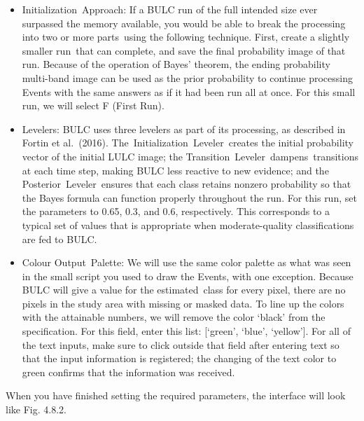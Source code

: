 \documentclass[
  letterpaper,
  DIV=11,
  numbers=noendperiod]{scrreprt}
\providecommand{\tightlist}{%
  \setlength{\itemsep}{0pt}\setlength{\parskip}{0pt}}\usepackage{longtable,booktabs,array}
\begin{document}
\begin{itemize}
\tightlist
\item
  Initialization~Approach: If a BULC run of the full intended size ever
  surpassed the memory available, you would be able to break the
  processing into two or more parts~using the following technique.
  First, create a slightly smaller run~that can complete, and save the
  final probability image of that run. Because of the operation of
  Bayes' theorem, the ending probability multi-band image can be used as
  the prior probability to continue processing Events with the same
  answers as if it had been run all at once. For this small run, we will
  select F (First Run).
\item
  Levelers: BULC uses three levelers as part of its processing, as
  described in Fortin et al.~(2016). The~Initialization~Leveler~creates
  the initial probability vector of the initial LULC image; the
  Transition~Leveler~dampens~transitions at each time step, making BULC
  less reactive to new evidence; and the Posterior~Leveler~ensures that
  each class retains nonzero probability so that the Bayes formula can
  function properly throughout the run. For this run, set the parameters
  to 0.65, 0.3, and 0.6, respectively. This corresponds to a typical set
  of values that is appropriate when moderate-quality classifications
  are fed to BULC.
\item
  Colour Output~Palette: We will use the same color palette as what was
  seen in the small script you used to draw the Events, with one
  exception. Because BULC will give a value for the estimated~class for
  every pixel, there are no pixels in the study area with missing or
  masked data. To line up the colors with the attainable numbers, we
  will remove the color `black' from the specification. For this field,
  enter this list: {[}`green', `blue', `yellow'{]}. For all of the text
  inputs, make sure to click outside that field after entering text so
  that the input information is registered; the changing of the text
  color to green confirms that the information was received.
\end{itemize}

When you have finished setting the required parameters, the interface
will look like Fig. 4.8.2.
\end{document}
